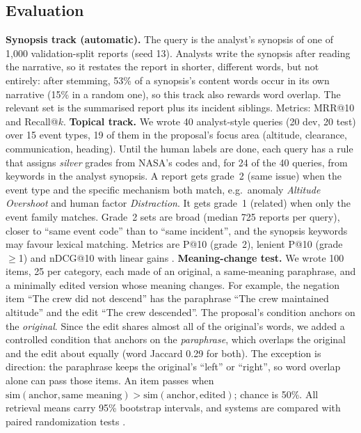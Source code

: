 \documentclass[conference]{IEEEtran}
\begin{document}
\subsection{Evaluation}
\textbf{Synopsis track (automatic).} The query is the analyst's synopsis of one of 1,000
validation-split reports (seed 13). Analysts write the synopsis after reading the
narrative, so it restates the report in shorter, different words, but not entirely: after
stemming, 53\% of a synopsis's content words occur in its own narrative (15\% in a random
one), so this track also rewards word overlap. The relevant set is the summarised report
plus its incident siblings. Metrics: MRR@10 and Recall@$k$.
\textbf{Topical track.} We wrote 40 analyst-style queries (20 dev, 20 test) over 15 event
types, 19 of them in the proposal's focus area (altitude, clearance, communication,
heading). Until the human labels are done, each query has a rule that assigns
\emph{silver} grades from NASA's codes and, for 24 of the 40 queries, from keywords in the
analyst synopsis. A report gets grade~2 (same issue) when the event type and the specific
mechanism both match, e.g.\ anomaly \emph{Altitude Overshoot} and human factor
\emph{Distraction}. It gets grade~1 (related) when only the event family matches. Grade~2
sets are broad (median 725 reports per query), closer to ``same event code'' than to
``same incident'', and the synopsis keywords may favour lexical matching.
Metrics are P@10 (grade~2), lenient P@10 (grade~$\ge$1) and nDCG@10 with linear gains
\cite{jarvelin2002ndcg}.
\textbf{Meaning-change test.} We wrote 100 items, 25 per category, each made of an
original, a same-meaning paraphrase, and a minimally edited version whose meaning
changes. For example, the negation item ``The crew did not descend'' has the paraphrase
``The crew maintained altitude'' and the edit ``The crew descended''. The proposal's
condition anchors on the \emph{original}. Since the edit shares almost all of the
original's words, we added a controlled condition that anchors on the \emph{paraphrase},
which overlaps the original and the edit about equally (word Jaccard 0.29 for both). The
exception is direction: the paraphrase keeps the original's ``left'' or ``right'', so word
overlap alone can pass those items. An item passes when
$\mathrm{sim}(\text{anchor},\text{same meaning})>\mathrm{sim}(\text{anchor},\text{edited})$;
chance is 50\%.
All retrieval means carry 95\% bootstrap intervals, and systems are compared with paired
randomization tests \cite{smucker2007significance}.
\end{document}
